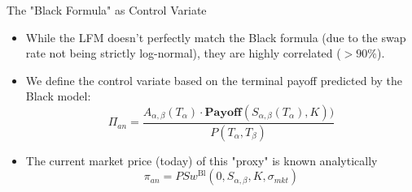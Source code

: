 \documentclass{beamer}
\begin{document}
\begin{frame}{The "Black Formula" as Control Variate}
	\begin{itemize}
	\item While the LFM doesn't perfectly match the Black formula (due to the swap rate not being strictly log-normal), they are highly correlated ($>90\%$).
	\item We define the control variate based on the terminal payoff predicted by the Black model:
	\begin{equation*}
	\Pi_{an} = \frac{A_{\alpha,\beta}(T_\alpha)\cdot\textbf{Payoff}(S_{\alpha,\beta}(T_\alpha),K))}{P(T_\alpha, T_\beta)}
	\end{equation*}
	\item The current market price (today) of this "proxy" is known analytically
		\begin{equation*}
			\pi_{an}=PSw^{\text{Bl}}(0, S_{\alpha,\beta}, K, \sigma_{mkt})
		\end{equation*}
	\end{itemize}
\end{frame}

\end{document}
